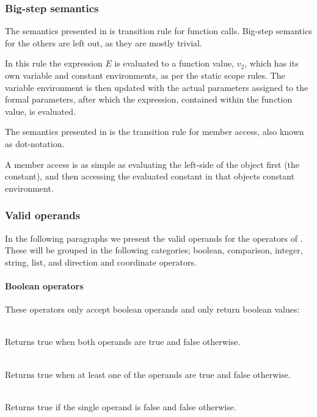 \subsubsection{Big-step semantics}

The semantics presented in  is transition
rule for function calls. Big-step semantics for the others are left out,
as they are mostly trivial.



In this rule the expression $E$ is evaluated to a function value, $v_2$, which
has its own variable and constant environments, as per the static scope rules.
The variable environment is then updated with the actual parameters assigned to
the formal parameters, after which the expression, contained within the function
value, is evaluated.

The semantics presented in  is the transition rule
for member access, also known as dot-notation.



A member access is as simple as evaluating the left-side of the object
first (the constant), and then accessing the evaluated constant in that
objects constant environment.

\subsubsection{Valid operands}
\label{sec:validoperands}
In the following paragraphs we present the valid operands for the operators of
\productname{}. These will be grouped in the following categories; boolean,
comparison, integer, string, list, and direction and coordinate operators.

\paragraph{Boolean operators}

These operators only accept boolean operands and only return boolean values:

\begin{dlist}
  \item {}\\
    Returns true when both operands are true and false otherwise. 
  \item {}\\
    Returns true when at least one of the operands are true and false otherwise.
  \item {}\\
    Returns true if the single operand is false and false otherwise.
\end{dlist}

